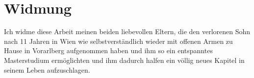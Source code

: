 \documentclass[Bachelorarbeit.tex]{subfiles}
\begin{document}
\chapter*{Widmung}
Ich widme diese Arbeit meinen beiden liebevollen Eltern, die den verlorenen Sohn nach 11 Jahren in Wien wie selbstverständlich wieder mit offenen Armen zu Hause in Vorarlberg aufgenommen haben und ihm so ein entspanntes Masterstudium ermöglichten und ihm dadurch halfen ein völlig neues Kapitel in seinem Leben aufzuschlagen.
\end{document}
